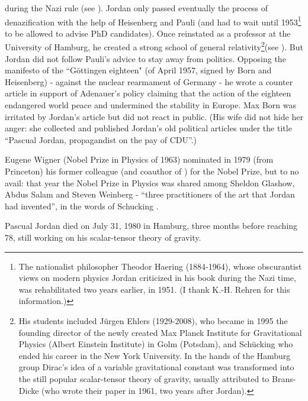 \documentclass[12pt]{article}
\begin{document}
during the Nazi rule (see \cite{B05}). Jordan only passed eventually the process of denazification with the help of Heisenberg and 
Pauli (and had to wait until 1953\footnote{The nationalist philosopher Theodor Haering (1884-1964), whose 
obscurantist views on modern physics Jordan criticized in his book \cite{J41} during the Nazi time, was rehabilitated 
two years earlier, in 1951. (I thank K.-H. Rehren for this information.)}  to be allowed to advise PhD candidates). Once reinstated 
as a professor at the University of Hamburg, he created a strong school of general relativity\footnote{His students included
J\"urgen Ehlers (1929-2008), who became in 1995 the founding director of the newly created Max Planck Institute for Gravitational 
Physics (Albert Einstein Institute) in Golm (Potsdam), and Sch\"ucking who ended his career in the New York University. In the
hands of the Hamburg group Dirac's idea of a variable gravitational constant was transformed into the still popular scalar-tensor
theory of gravity, usually attributed to Brans-Dicke (who wrote their paper in 1961, two years after Jordan).}(see \cite{E09}). But 
Jordan did not follow Pauli's advice to stay away from politics. Opposing the manifesto of the ``G\"ottingen eighteen" 
(of April 1957, signed by Born and Heisenberg) - against the nuclear rearmament of Germany - he wrote a 
counter article in support of Adenauer's policy claiming that the action of the eighteen endangered world
peace and undermined the stability in Europe. Max Born was irritated by Jordan's article but did
not react in public. (His wife did not hide her anger: she collected and published Jordan's old political
articles under the title ``Pascual Jordan, propagandist on the pay of CDU''.)

Eugene Wigner (Nobel Prize in Physics of 1963) nominated in 1979 (from Princeton) his former
colleague (and coauthor of \cite{JW28}) for the Nobel Prize, but to no avail: that year the Nobel
Prize in Physics was shared among Sheldon Glashow, Abdus Salam and Steven Weinberg - ``three
practitioners of the art that Jordan had invented'', in the words of Schucking \cite{Sch99}.

Pascual Jordan died on July 31, 1980 in Hamburg, three months before reaching 78, 
still working on his scalar-tensor theory of gravity.

\bigskip
\end{document}

